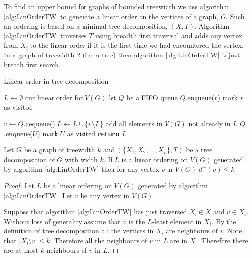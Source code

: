 To find an upper bound for graphs of bounded treewidth we use algorithm \ref{alg:LinOrderTW} to generate a linear order on the vertices of a graph, $G$. Such an ordering is based on a minimal tree decomposition, $(X,T)$. Algorithm \ref{alg:LinOrderTW} traverses $T$ using breadth first traversal and adds any vertex from $X_i$ to the linear order if it is the first time we  had encountered the vertex. In a graph of treewidth 2 (i.e. a tree) then algorithm \ref{alg:LinOrderTW} is just breath first search.

\begin{algorithm}[h]
    \caption{Linear order in tree decomposition}
    \label{alg:LinOrderTW}
    \begin{algorithmic}[1]
        
            \State $L \gets \emptyset$ \Comment our linear order for $V(G)$
            \State let $Q$ be a FIFO queue 
            \State $Q$.enqueue($r$)
            \State mark $r$ as visited
            
                \State $v \gets Q$.dequeue()
                \State $L \gets L \cup \{v\setminus L\}$ \Comment add all elements in $V(G)$ not already in $L$
                    \State $Q$.enqueue($U$)
                    \State mark $U$ as visited
                \EndFor        
            \EndWhile 
            \State \textbf{return}  $L$
        \EndFunction
    \end{algorithmic}
\end{algorithm}

\begin{lemma}[Askes] \label{Lemma_TWLinOrdBound}
    Let $G$ be a graph of treewidth $k$ and $(\{X_1,X_2,\dots,X_n\},T)$ be a tree decomposition of $G$ with width $k$.
    If $L$ is a linear ordering on $V(G)$ generated by algorithm \ref{alg:LinOrderTW} then for any vertex $v$ in $V(G)$ 
    $d^+(v) \leq k$
\end{lemma}

\begin{proof}    
    Let $L$ bs a linear ordering on $V(G)$ generated by algorithm \ref{alg:LinOrderTW}. Let $v$ be any vertex in $V(G)$. %
    
    Suppose that algorithm \ref{alg:LinOrderTW} has just traversed $X_i\in X$ and $v\in X_i$. Without loss of generality assume that $v$ is the $L$-least element in $X_i$. By the definition of tree decomposition all the vertices in $X_i$ are neighbours of $v$. Note that $|X_i\setminus v|\leq k$. Therefore all the neighbours of $v$ in $L$ are in $X_i$. Therefore there are at most $k$ neighbours of $v$ in $L$.   
\end{proof}

